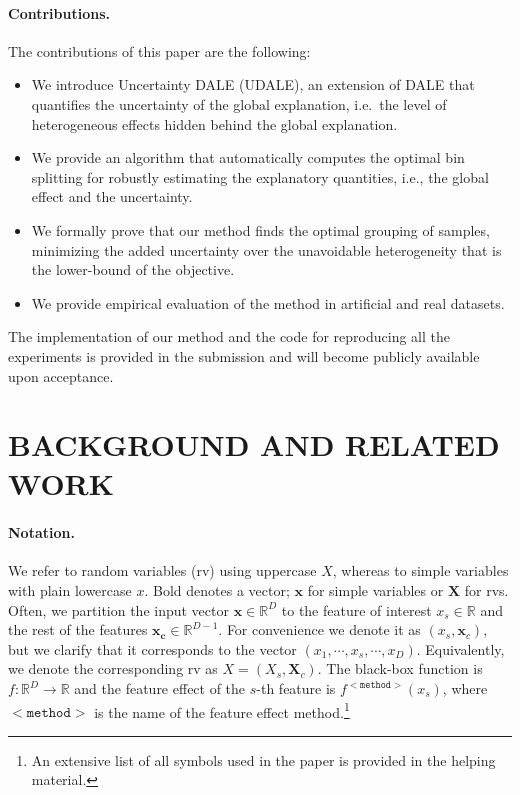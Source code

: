 \documentclass[twoside]{article}
\newcommand{\xc}{\mathbf{x_c}}
\newcommand{\xb}{\mathbf{x}}
\begin{document}
\paragraph{Contributions.} The contributions of this paper are the following:

\begin{itemize}
\item We introduce Uncertainty DALE (UDALE), an extension of DALE that
  quantifies the uncertainty of the global explanation, i.e.~the level
  of heterogeneous effects hidden behind the global explanation.
\item
  We provide an algorithm that automatically computes the optimal bin
  splitting for robustly estimating the explanatory quantities, i.e.,
  the global effect and the uncertainty.
\item We formally prove that our method finds the optimal grouping of
  samples, minimizing the added uncertainty over the unavoidable
  heterogeneity that is the lower-bound of the objective.
\item We provide empirical evaluation of the method in artificial and
  real datasets.
\end{itemize}


The implementation of our method and the code for reproducing all the
experiments is provided in the submission and will become publicly
available upon acceptance.


\section{BACKGROUND AND RELATED WORK}

\paragraph{Notation.} We refer to random variables (rv) using
uppercase \( X \), whereas to simple variables with plain lowercase
\( x \). Bold denotes a vector; \( \xb \) for simple variables or
\(\mathbf{X}\) for rvs. Often, we partition the input vector
\(\xb \in \mathbb{R}^D\) to the feature of interest
\(x_s \in \mathbb{R} \) and the rest of the features
\(\xc \in \mathbb{R}^{D-1}\). For convenience we denote it as
\((x_s, \mathbf{x}_c)\), but we clarify that it corresponds to the
vector \((x_1, \cdots , x_s, \cdots, x_D)\). Equivalently, we denote
the corresponding rv as \(X = (X_s, \mathbf{X}_c)\). The black-box
function is \(f : \mathbb{R}^D \rightarrow \mathbb{R}\) and the
feature effect of the \(s\)-th feature is
\(f^{\mathtt{<method>}}(x_s)\), where \(\mathtt{<method>}\) is the
name of the feature effect method.\footnote{An extensive list of all
  symbols used in the paper is provided in the helping material.}
\end{document}

